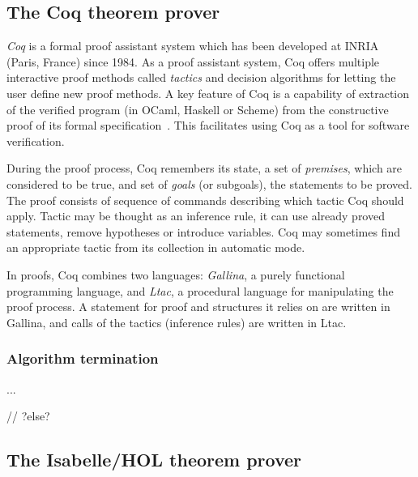 \documentclass[article]{aaltoseries}
\begin{document}

\subsection{The Coq theorem prover}
\label{sec:prover_coq}

\textit{Coq} is a formal proof assistant system which has been developed at INRIA (Paris, France) since 1984. As a proof assistant system, Coq offers multiple interactive proof methods called \textit{tactics} and decision algorithms for letting the user define new proof methods. A key feature of Coq is a capability of extraction of the verified program (in OCaml, Haskell or Scheme) from the constructive proof of its formal specification~\cite{Let08}. This facilitates using Coq as a tool for software verification.

During the proof process, Coq remembers its state, a set of \textit{premises}, which are considered to be true, and set of \textit{goals} (or subgoals), the statements to be proved. The proof consists of sequence of commands describing which tactic Coq should apply. Tactic may be thought as an inference rule, it can use already proved statements, remove hypotheses or introduce variables. Coq may sometimes find an appropriate tactic from its collection in automatic mode.

In proofs, Coq combines two languages: \textit{Gallina}, a purely functional programming language, and \textit{Ltac}, a procedural language for manipulating the proof process. A statement for proof and structures it relies on are written in Gallina, and calls of the tactics (inference rules) are written in Ltac.

\subsubsection{Algorithm termination}
...

// ?else?


\subsection{The Isabelle/HOL theorem prover}
\label{sec:prover_isabelle}
\end{document}
